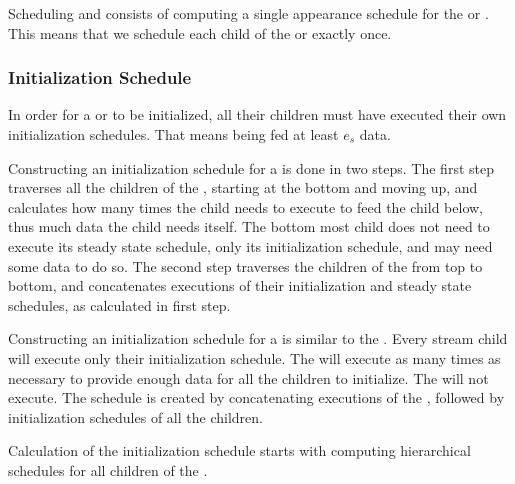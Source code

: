 Scheduling \pipelines and \splitjoin consists of computing a
single appearance schedule for the \pipeline or \splitjoin. This
means that we schedule each child of the \pipeline or \splitjoin
exactly once.

\subsubsection{Initialization Schedule}

In order for a \pipeline or \splitjoin to be initialized, all
their children must have executed their own initialization
schedules. That means being fed at least $e_s$ data.

Constructing an initialization schedule for a \pipeline is done in
two steps. The first step traverses all the children of the
\pipeline, starting at the bottom and  moving up, and calculates
how many times the child needs to execute to feed the child below,
thus much data the child needs itself. The bottom most child does
not need to execute its steady state schedule, only its
initialization schedule, and may need some data to do so. The
second step traverses the children of the \pipeline from top to
bottom, and concatenates executions of their initialization and
steady state schedules, as calculated in first step.

Constructing an initialization schedule for a \splitjoin is
similar to the \pipeline. Every stream child will execute only
their initialization schedule. The \splitter will execute as many
times as necessary to provide enough data for all the children to
initialize. The \joiner will not execute. The schedule is created
by concatenating executions of the \splitter, followed by
initialization schedules of all the children.

Calculation of the initialization schedule starts with computing
hierarchical schedules for all children of the {\pipeline}.

